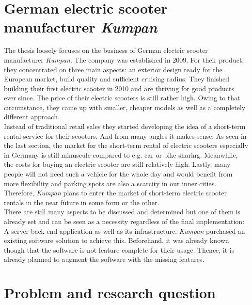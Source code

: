 \documentclass[12pt,a4paper]{report}
\begin{document}
\section{German electric scooter manufacturer \textit{Kumpan}}

The thesis loosely focuses on the business of German electric scooter manufacturer \textit{Kumpan}.
The company was established in 2009. For their product, they concentrated on three main aspects:
an exterior design ready for the European market, build quality and sufficient cruising radius.
They finished building their first electric scooter in 2010 and are thriving for good products ever since.
The price of their electric scooters is still rather high. Owing to that circumstance,
they came up with smaller, cheaper models as well as a completely different approach.\\
Instead of traditional retail sales they started developing the idea of a
short-term rental service for their scooters. And from many angles it makes sense:
As seen in the last section, the market for the short-term rental of electric scooters
especially in Germany is still minuscule compared to e.g. car or bike sharing.
Meanwhile, the costs for buying an electric scooter are still relatively high.
Lastly, many people will not need such a vehicle for the whole day and would benefit
from more flexibility and parking spots are also a scarcity in our inner cities.
Therefore, \textit{Kumpan} plans to enter the market of short-term electric scooter rentals
in the near future in some form or the other.\\
There are still many aspects to be discussed and determined but one of them
is already set and can be seen as a necessity regardless of the final implementation:
A server back-end application as well as its infrastructure.
\textit{Kumpan} purchased an existing software solution to achieve this.
Beforehand, it was already known though that the software is not feature-complete
for their usage. Thence, it is already planned to augment the software with the missing
features.


\section{Problem and research question}
\end{document}
